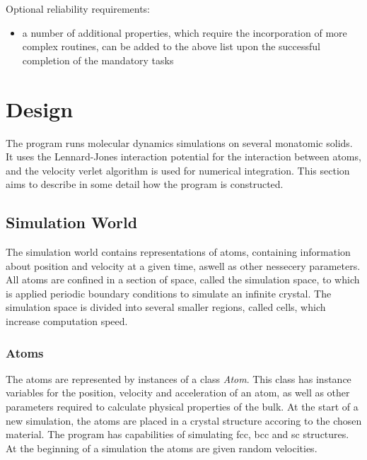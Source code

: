 \documentclass[12pt,a4paper]{article}
\begin{document}
Optional reliability requirements:
\begin{itemize}
\item a number of additional properties, which require the incorporation of more complex routines, can be added to the above list upon the successful completion of the mandatory tasks
\end{itemize}

\newpage
\section{Design}
The program runs molecular dynamics simulations on several monatomic solids. It uses the Lennard-Jones interaction potential for the interaction between atoms, and the velocity verlet algorithm is used for numerical integration. This section aims to describe in some detail how the program is constructed.

\subsection{Simulation World}
\label{sec:simulation_world}
The simulation world contains representations of atoms, containing information about position and velocity at a given time, aswell as other nessecery parameters.  All atoms are confined in a section of space, called the simulation space, to which is applied periodic boundary conditions to simulate an infinite crystal. The simulation space is divided into several smaller regions, called cells, which increase computation speed. 

\subsubsection{Atoms}
\label{sec:atoms}
The atoms are represented by instances of a class \emph{Atom}. This class has instance variables for the position, velocity and acceleration of an atom, as well as other parameters required to calculate physical properties of the bulk. At the start of a new simulation, the atoms are placed in a crystal structure accoring to the chosen material. The program has capabilities of simulating fcc, bcc and sc structures. At the beginning of a simulation the atoms are given random velocities. 
\end{document}
